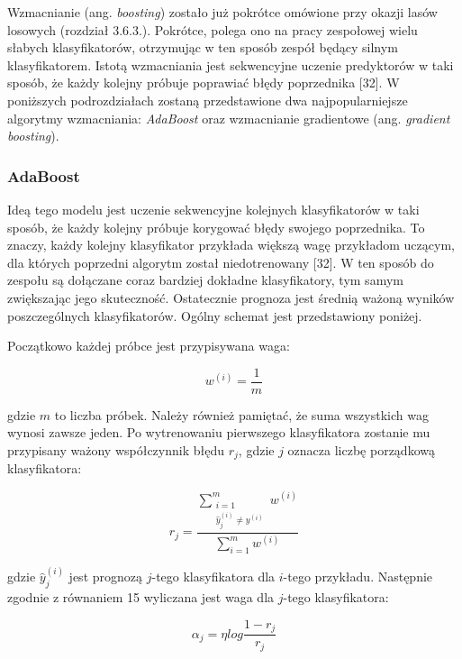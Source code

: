 Wzmacnianie (ang. \textit{boosting}) zostało już pokrótce omówione przy okazji lasów losowych (rozdział 3.6.3.). Pokrótce, polega ono na pracy zespołowej wielu słabych klasyfikatorów, otrzymując w ten sposób zespół będący silnym klasyfikatorem. Istotą wzmacniania jest sekwencyjne uczenie predyktorów w taki sposób, że każdy kolejny próbuje poprawiać błędy poprzednika [32]. W poniższych podrozdziałach zostaną przedstawione dwa najpopularniejsze algorytmy wzmacniania: \textit{AdaBoost} oraz wzmacnianie gradientowe (ang. \textit{gradient boosting}). 


\subsubsection{AdaBoost}
\label{AdaBoost}

Ideą tego modelu jest uczenie sekwencyjne kolejnych klasyfikatorów w taki sposób, że każdy kolejny próbuje korygować błędy swojego poprzednika. To znaczy, każdy kolejny klasyfikator przykłada większą wagę przykładom uczącym, dla których poprzedni algorytm został niedotrenowany [32]. W ten sposób do zespołu są dołączane coraz bardziej dokładne klasyfikatory, tym samym zwiększając jego skuteczność. Ostatecznie prognoza jest średnią ważoną wyników poszczególnych klasyfikatorów. Ogólny schemat jest przedstawiony poniżej.

Początkowo każdej próbce jest przypisywana waga:

\begin{equation}
	w^{(i)}=\frac 1 m
\end{equation}

\noindent gdzie $m$ to liczba próbek. Należy również pamiętać, że suma wszystkich wag wynosi zawsze jeden. Po wytrenowaniu pierwszego klasyfikatora zostanie mu przypisany ważony współczynnik błędu $r_j$, gdzie $j$ oznacza liczbę porządkową klasyfikatora:

\begin{equation}
	r_j = \frac { \sum\limits_{\substack{i=1 \\ \hat y_j^{(i)} \neq y^{(i)}}}^{m} w^{(i)}}{{\sum\limits_{i=1}^{m} w^{(i)}}}
\end{equation}

\noindent gdzie $\hat y_j^{(i)}$ jest prognozą $j$-tego klasyfikatora dla $i$-tego przykładu. Następnie zgodnie z  równaniem 15 wyliczana jest waga dla $j$-tego klasyfikatora:

\begin{equation}
	\alpha_j=\eta log\frac {1-r_j} {r_j}
\end{equation}

